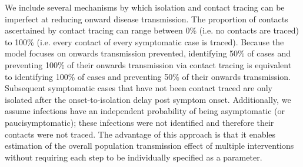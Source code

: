 \documentclass{article}
\begin{document}
We include several mechanisms by which isolation and contact tracing can be imperfect at reducing onward disease transmission. The proportion of contacts ascertained by contact tracing can range between 0\% (i.e. no contacts are traced) to 100\% (i.e. every contact of every symptomatic case is traced). Because the model focuses on onwards transmission prevented, identifying 50\% of cases and preventing 100\% of their onwards transmission via contact tracing is equivalent to identifying 100\% of cases and preventing 50\% of their onwards transmission. Subsequent symptomatic cases that have not been contact traced are only isolated after the onset-to-isolation delay post symptom onset. Additionally, we assume infections have an independent probability of being asymptomatic (or paucisymptomatic); these infections were not identified and therefore their contacts were not traced. The advantage of this approach is that it enables estimation of the overall population transmission effect of multiple interventions without requiring each step to be individually specified as a parameter.
\end{document}
